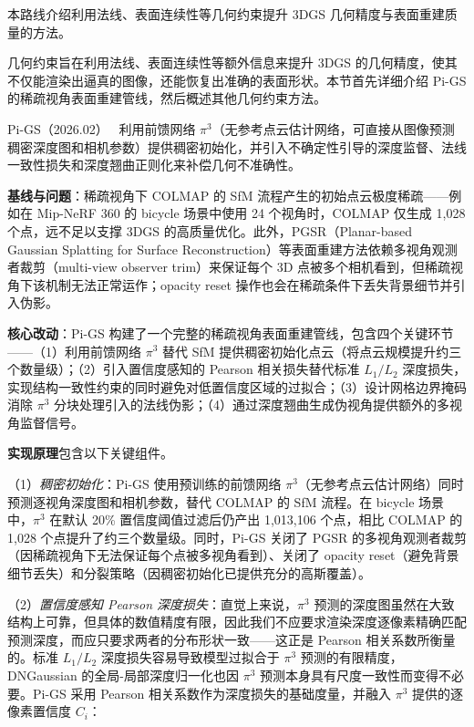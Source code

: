 本路线介绍利用法线、表面连续性等几何约束提升 3DGS 几何精度与表面重建质量的方法。

几何约束旨在利用法线、表面连续性等额外信息来提升 3DGS 的几何精度，使其不仅能渲染出逼真的图像，还能恢复出准确的表面形状。本节首先详细介绍 Pi-GS 的稀疏视角表面重建管线，然后概述其他几何约束方法。

Pi-GS（2026.02）~\cite{2602_03327} 利用前馈网络 $\pi^3$（无参考点云估计网络，可直接从图像预测稠密深度图和相机参数）提供稠密初始化，并引入不确定性引导的深度监督、法线一致性损失和深度翘曲正则化来补偿几何不准确性。

\textbf{基线与问题}：稀疏视角下 COLMAP 的 SfM 流程产生的初始点云极度稀疏——例如在 Mip-NeRF 360 的 bicycle 场景中使用 24 个视角时，COLMAP 仅生成 1,028 个点，远不足以支撑 3DGS 的高质量优化。此外，PGSR（Planar-based Gaussian Splatting for Surface Reconstruction）等表面重建方法依赖多视角观测者裁剪（multi-view observer trim）来保证每个 3D 点被多个相机看到，但稀疏视角下该机制无法正常运作；opacity reset 操作也会在稀疏条件下丢失背景细节并引入伪影。

\textbf{核心改动}：Pi-GS 构建了一个完整的稀疏视角表面重建管线，包含四个关键环节——（1）利用前馈网络 $\pi^3$ 替代 SfM 提供稠密初始化点云（将点云规模提升约三个数量级）；（2）引入置信度感知的 Pearson 相关损失替代标准 $L_1/L_2$ 深度损失，实现结构一致性约束的同时避免对低置信度区域的过拟合；（3）设计网格边界掩码消除 $\pi^3$ 分块处理引入的法线伪影；（4）通过深度翘曲生成伪视角提供额外的多视角监督信号。

\textbf{实现原理}包含以下关键组件。

（1）\textit{稠密初始化}：Pi-GS 使用预训练的前馈网络 $\pi^3$（无参考点云估计网络）同时预测逐视角深度图和相机参数，替代 COLMAP 的 SfM 流程。在 bicycle 场景中，$\pi^3$ 在默认 20\% 置信度阈值过滤后仍产出 1,013,106 个点，相比 COLMAP 的 1,028 个点提升了约三个数量级。同时，Pi-GS 关闭了 PGSR 的多视角观测者裁剪（因稀疏视角下无法保证每个点被多视角看到）、关闭了 opacity reset（避免背景细节丢失）和分裂策略（因稠密初始化已提供充分的高斯覆盖）。

（2）\textit{置信度感知 Pearson 深度损失}：直觉上来说，$\pi^3$ 预测的深度图虽然在大致结构上可靠，但具体的数值精度有限，因此我们不应要求渲染深度逐像素精确匹配预测深度，而应只要求两者的分布形状一致——这正是 Pearson 相关系数所衡量的。标准 $L_1/L_2$ 深度损失容易导致模型过拟合于 $\pi^3$ 预测的有限精度，DNGaussian 的全局-局部深度归一化也因 $\pi^3$ 预测本身具有尺度一致性而变得不必要。Pi-GS 采用 Pearson 相关系数作为深度损失的基础度量，并融入 $\pi^3$ 提供的逐像素置信度 $C_i$：

